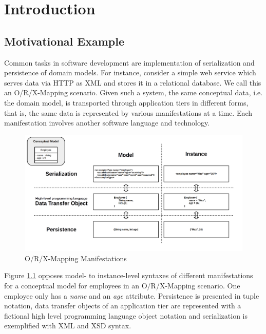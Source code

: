 \chapter{Introduction}
\label{chapter:Introduction}

\section{Motivational Example}
Common tasks in software development are implementation of serialization and persistence of domain models.
For instance, consider a simple web service which serves data via \gls{HTTP} as \gls{XML} and stores it in a relational database.
We call this an \gls{O/R/X-Mapping} scenario.
Given such a system, the same conceptual data, i.e. the domain model, is transported through application tiers in different forms, that is, the same data is represented by various manifestations at a time.
Each manifestation involves another software language and technology.
\begin{figure}[h!]
\begin{center}
\includegraphics[width=.9\textwidth]{images/ORX.png}
\end{center}
\caption{O/R/X-Mapping Manifestations}
\label{figure:ORXManifestations}
\end{figure}
Figure \ref{figure:ORXManifestations} opposes model- to instance-level syntaxes of different manifestations for a conceptual model for employees in an \gls{O/R/X-Mapping} scenario.
One employee only has a \textit{name} and an \textit{age} attribute.
Persistence is presented in tuple notation, data transfer objects of an application tier are represented with a fictional high level programming language object notation and serialization is exemplified with \gls{XML} and \gls{XSD} syntax.

